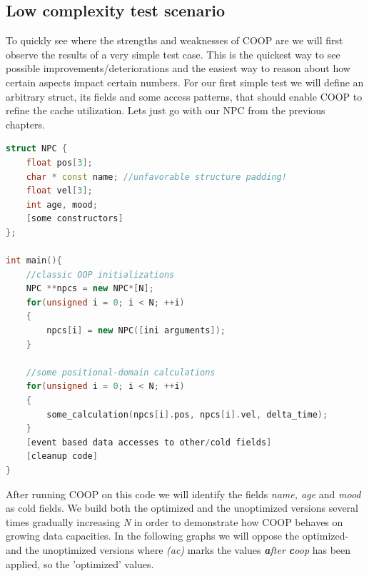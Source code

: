 \subsection{Low complexity test scenario}
To quickly see where the strengths and weaknesses of COOP are we will first observe the results of a very simple test case. This is the quickest way to see possible improvements/deteriorations and the easiest way to reason about how certain aspects impact certain numbers. For our first simple test we will define an arbitrary struct, its fields and some access patterns, that should enable COOP to refine the cache utilization. Lets just go with our NPC from the previous chapters.
\begin{lstlisting}[language=C++, name={Simple test code in order to make first tests. It will heavily use an NPC's positional properties (pos, vel) and basically disregard the fields name, age and mood, as they would be accessed based on user generated events.}, label={simple_test}]
struct NPC {
	float pos[3];
	char * const name; //unfavorable structure padding!
	float vel[3];
	int age, mood;
	[some constructors]
};

int main(){
	//classic OOP initializations
	NPC **npcs = new NPC*[N];
	for(unsigned i = 0; i < N; ++i)
	{
		npcs[i] = new NPC([ini arguments]);
	}
	
	//some positional-domain calculations
	for(unsigned i = 0; i < N; ++i)
	{
		some_calculation(npcs[i].pos, npcs[i].vel, delta_time);
	}	
	[event based data accesses to other/cold fields]
	[cleanup code]
}
\end{lstlisting}
After running COOP on this code we will identify the fields \textit{name, age} and \textit{mood} as cold fields. We build both the optimized and the unoptimized versions several times gradually increasing \textit{N} in order to demonstrate how COOP behaves on growing data capacities. In the following graphs we will oppose the optimized- and the unoptimized versions where \textit{(ac)} marks the values \textit{\textbf{a}fter \textbf{c}oop} has been applied, so the 'optimized' values.
